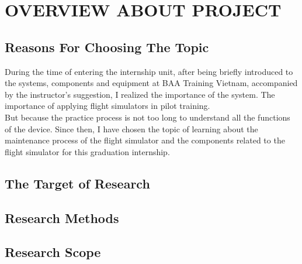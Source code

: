 \chapter{OVERVIEW ABOUT PROJECT}

\renewcommand{\headrulewidth}{0.5pt}
\renewcommand{\footrulewidth}{0.5pt}
\thispagestyle{plain}
\pagestyle{fancy}
\fancyhf{}
\raggedright
{}

\section{Reasons For Choosing The Topic}
    During the time of entering the internship unit, after being briefly introduced to the systems, components and equipment 
    at BAA Training Vietnam, accompanied by the instructor's suggestion, I realized the importance of the system. The importance 
    of applying flight simulators in pilot training. \\ 
    \vspace{3mm}
    But because the practice process is not too long to understand all the functions of the device. Since then, I have chosen the 
    topic of learning about the maintenance process of the flight simulator and the components related to the flight simulator for 
    this graduation internship.

\section{The Target of Research}

\section{Research Methods}

\section{Research Scope}